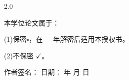 {{\begin{spacing}{2.0}
{		本学位论文属于：
		
		(1)保密$\square$，在~~~年解密后适用本授权书。
		
		(2)不保密 $\checkmark $。}%
        \end{spacing}

        \vspace{10pt}
        \vspace{10pt}
		\vspace{10pt}
        \vspace{10pt}
        \vspace{10pt}
		\vspace{10pt}
		\vspace{10pt}
        \vspace{10pt}
		\vspace{10pt}
        \begin{center}
            {\songti {}作者签名：\makebox[5em][c]{} \quad %
            日期：
            \makebox[3em][c]{} 年
            \makebox[1.5em][c]{} 月
            \makebox[1.5em][c]{} 日}
        \end{center}
    }
}